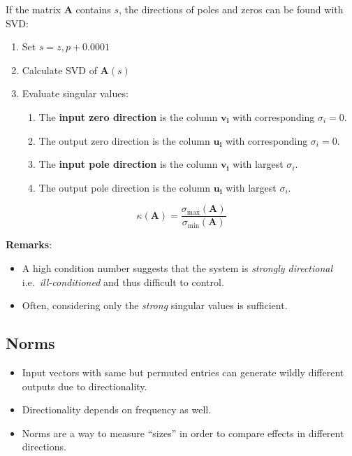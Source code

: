 If the matrix $\mathbf{A}$ contains $s$, the directions of poles and zeros can be found with SVD:
\begin{enumerate}
    \item Set $s=z, p+0.0001$
    \item Calculate SVD of $\mathbf{A}(s)$
    \item Evaluate singular values:
          \begin{enumerate}
              \item The \textbf{input zero direction} is the column $\mathbf{v_i}$ with corresponding $\sigma_i=0$.
              \item The output zero direction is the column $\mathbf{u_i}$ with corresponding $\sigma_i=0$.
              \item The \textbf{input pole direction} is the column $\mathbf{v_i}$ with largest $\sigma_i$.
              \item The output pole direction is the column $\mathbf{u_i}$ with largest $\sigma_i$.
          \end{enumerate}
\end{enumerate}

\newpar{}
\noindent\begin{equation*}
    \kappa(\mathbf{A})=\frac{\sigma_{\max}(\mathbf{A})}{\sigma_{\min}(\mathbf{A})}
\end{equation*}

\textbf{Remarks}:
\begin{itemize}
    \item A high condition number suggests that the system is \textit{strongly directional} i.e.\ \textit{ill-conditioned} and thus difficult to control.
    \item Often, considering only the \textit{strong} singular values is sufficient.
\end{itemize}

\subsection{Norms}
\begin{itemize}
    \item Input vectors with same but permuted entries can generate wildly different outputs due to directionality.
    \item Directionality depends on frequency as well.
    \item Norms are a way to measure ``sizes'' in order to compare effects in different directions.
\end{itemize}

